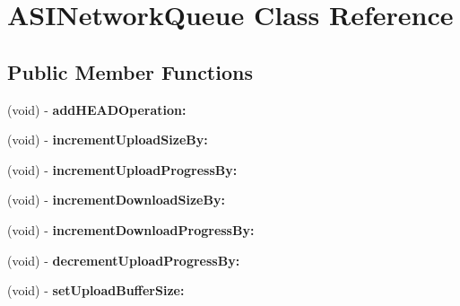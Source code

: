 \hypertarget{interface_a_s_i_network_queue}{
\section{ASINetworkQueue Class Reference}
\label{interface_a_s_i_network_queue}
}
\subsection*{Public Member Functions}
\begin{DoxyCompactItemize}
\item 
\hypertarget{interface_a_s_i_network_queue_a0c5d19648386364651e055b273597a75}{
(void) -\/ {\bfseries addHEADOperation:}}
\label{interface_a_s_i_network_queue_a0c5d19648386364651e055b273597a75}

\item 
\hypertarget{interface_a_s_i_network_queue_aa741f5a7ea9162b1009e06c20bbd059d}{
(void) -\/ {\bfseries incrementUploadSizeBy:}}
\label{interface_a_s_i_network_queue_aa741f5a7ea9162b1009e06c20bbd059d}

\item 
\hypertarget{interface_a_s_i_network_queue_a80cb21f7247d59e86ec03eb53c46b32f}{
(void) -\/ {\bfseries incrementUploadProgressBy:}}
\label{interface_a_s_i_network_queue_a80cb21f7247d59e86ec03eb53c46b32f}

\item 
\hypertarget{interface_a_s_i_network_queue_a03035b0202047221aa6c5497cbd0f77f}{
(void) -\/ {\bfseries incrementDownloadSizeBy:}}
\label{interface_a_s_i_network_queue_a03035b0202047221aa6c5497cbd0f77f}

\item 
\hypertarget{interface_a_s_i_network_queue_a7f6af576fd494c89383b1448bbe8e7a5}{
(void) -\/ {\bfseries incrementDownloadProgressBy:}}
\label{interface_a_s_i_network_queue_a7f6af576fd494c89383b1448bbe8e7a5}

\item 
\hypertarget{interface_a_s_i_network_queue_a6c29fa8b8e1bb23bb247387281569a02}{
(void) -\/ {\bfseries decrementUploadProgressBy:}}
\label{interface_a_s_i_network_queue_a6c29fa8b8e1bb23bb247387281569a02}

\item 
\hypertarget{interface_a_s_i_network_queue_a1aa7f67c2b2371f12f43fe1c48f055e8}{
(void) -\/ {\bfseries setUploadBufferSize:}}
\label{interface_a_s_i_network_queue_a1aa7f67c2b2371f12f43fe1c48f055e8}


\end{DoxyCompactItemize}
